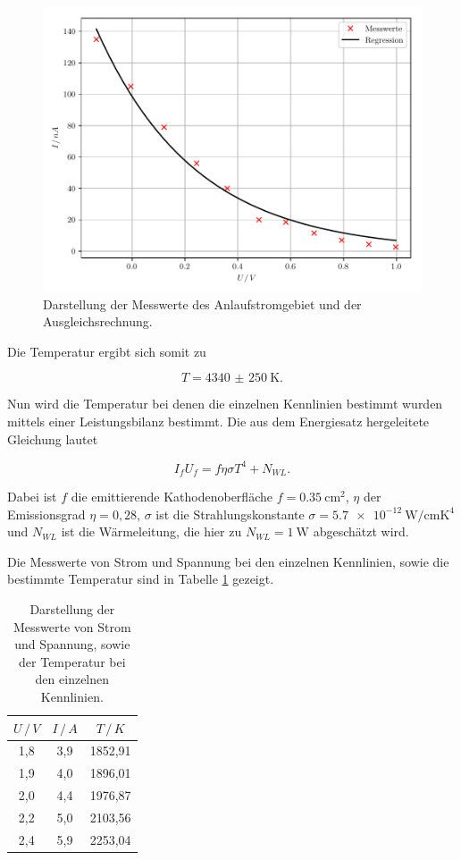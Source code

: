 \begin{figure}[H]
  \centering
  \includegraphics{plot3.pdf}
  \caption{Darstellung der Messwerte des Anlaufstromgebiet und der Ausgleichsrechnung.}
  \label{abb:8}
\end{figure}

Die Temperatur ergibt sich somit zu

\begin{equation*}
  T = \SI{4340(250)}{\kelvin}.
\end{equation*}

Nun wird die Temperatur bei denen die einzelnen Kennlinien bestimmt wurden mittels
einer Leistungsbilanz bestimmt. Die aus dem Energiesatz hergeleitete Gleichung lautet

\begin{equation*}
  I_f U_f = f \eta \sigma T^4 + N_{WL}.
\end{equation*}

Dabei ist $f$ die emittierende Kathodenoberfläche $f = \SI{0.35}{\centi\meter\squared}$,
$\eta$ der Emissionsgrad $\eta = 0,28$, $\sigma$ ist die Strahlungskonstante $\sigma = \SI{5.7e-12}{\watt\per\centi\meter\kelvin\tothe{4}}$
und $N_{WL}$ ist die Wärmeleitung, die hier zu $N_{WL} = \SI{1}{\watt}$ abgeschätzt wird.

Die Messwerte von Strom und Spannung bei den einzelnen Kennlinien, sowie die
bestimmte Temperatur sind in Tabelle \ref{tab:4} gezeigt.

\begin{table}[H]
  \centering
  \caption{Darstellung der Messwerte von Strom und Spannung, sowie der Temperatur bei den einzelnen Kennlinien.}
  \label{tab:4}
  \begin{tabular}{c c c}
    \toprule
    $U \, / \, V$ & $I \, / \, A$ & $T \, / \, K$ \\
    \midrule
    1,8 & 3,9 & 1852,91 \\
    1,9 & 4,0 & 1896,01 \\
    2,0 & 4,4 & 1976,87 \\
    2,2 & 5,0 & 2103,56 \\
    2,4 & 5,9 & 2253,04 \\
    \bottomrule
  \end{tabular}
\end{table}


